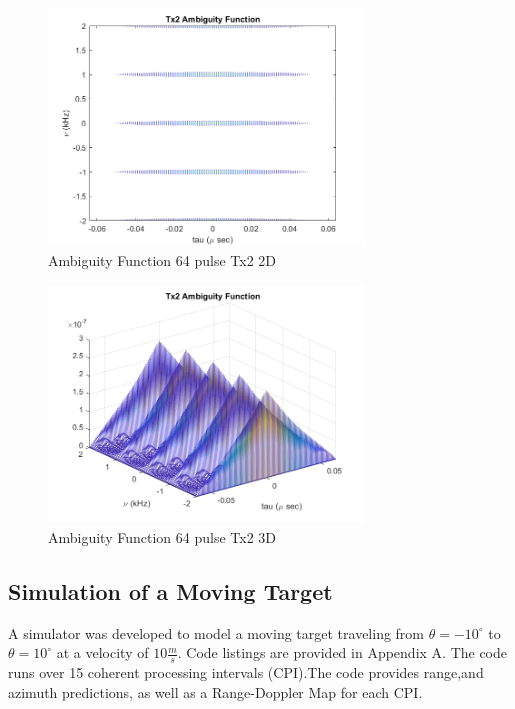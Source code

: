 \documentclass{article}
\begin{document}
\begin{figure}[H]
    \centering
    \includegraphics[width=0.75\textwidth]{figures/ambiguityFunction_64pulse_Tx2_2D.png}
    \caption{Ambiguity Function 64 pulse Tx2 2D}
    \label{fig:AF64_Tx2_2D}
\end{figure}

\begin{figure}[H]
    \centering
    \includegraphics[width=0.75\textwidth]{figures/ambiguityFunction_64pulse_Tx2_3D.png}
    \caption{Ambiguity Function 64 pulse Tx2 3D}
    \label{fig:AF64_Tx2_3D}
\end{figure}

\subsection{Simulation of a Moving Target}
A simulator was developed to model a moving target traveling from $\theta = -10^{\circ}$ to $\theta = 10^{\circ}$ at a velocity of $10 \frac{m}{s}$. Code listings are provided in Appendix A. The code runs over 15 coherent processing intervals (CPI).The code provides range,and  azimuth predictions, as well as a Range-Doppler Map for each CPI. 
\end{document}

